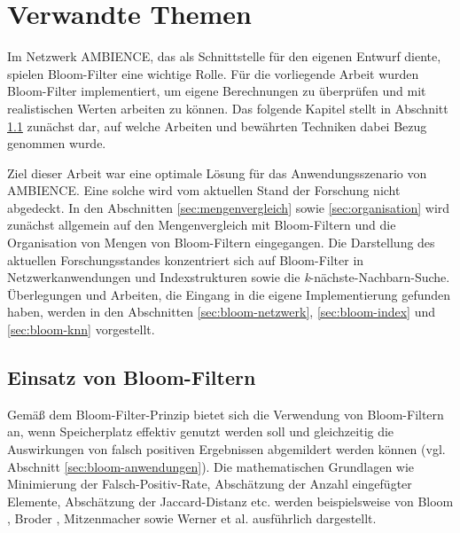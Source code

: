 \chapter{Verwandte Themen}\label{ch:related}
\enlargethispage{2\baselineskip}
Im Netzwerk AMBIENCE, das als Schnittstelle für den eigenen Entwurf diente, spielen Bloom-Filter eine wichtige Rolle. Für die vorliegende Arbeit wurden Bloom-Filter implementiert, um eigene Berechnungen zu überprüfen und mit realistischen Werten arbeiten zu können. Das folgende Kapitel stellt in Abschnitt \ref{sec:bloom-implementierung} zunächst dar, auf welche Arbeiten und bewährten Techniken dabei Bezug genommen wurde.  

Ziel dieser Arbeit war eine optimale Lösung für das Anwendungsszenario von AMBIENCE. Eine solche wird vom aktuellen Stand der Forschung nicht abgedeckt. In den Abschnitten \ref{sec:mengenvergleich} sowie \ref{sec:organisation} wird zunächst allgemein auf den Mengenvergleich mit Bloom-Filtern und die Organisation von Mengen von Bloom-Filtern eingegangen. Die Darstellung des aktuellen Forschungsstandes konzentriert sich auf Bloom-Filter in Netzwerkanwendungen und Indexstrukturen sowie die \textit{k}-nächste-Nachbarn-Suche. Überlegungen und Arbeiten, die Eingang in die eigene Implementierung gefunden haben, werden in den Abschnitten \ref{sec:bloom-netzwerk}, \ref{sec:bloom-index} und \ref{sec:bloom-knn} vorgestellt. 
\section{Einsatz von Bloom-Filtern}\label{sec:bloom-implementierung}
Gemäß dem Bloom-Filter-Prinzip bietet sich die Verwendung von Bloom-Filtern an, wenn Speicherplatz effektiv genutzt werden soll und gleichzeitig die Auswirkungen von falsch positiven Ergebnissen abgemildert werden können (vgl. Abschnitt \ref{sec:bloom-anwendungen}). Die mathematischen Grundlagen wie Minimierung der Falsch-Positiv-Rate, Abschätzung der Anzahl eingefügter Elemente, Abschätzung der Jaccard-Distanz etc. werden beispielsweise von Bloom \cite{Bloom1970}, Broder \cite{Broder2004}, Mitzenmacher \cite{Mitzenmacher2002} sowie Werner et al. \cite{Werner2015} ausführlich dargestellt. 

